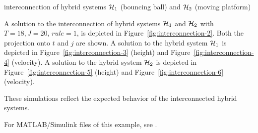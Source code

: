 \begin{example}{interconnection of hybrid systems $\mathcal{H}_1$ (bouncing ball) and $\mathcal{H}_2$ (moving platform)}
\begin{itemize}





\end{itemize}

A solution to the interconnection of hybrid systems $\mathcal{H}_1$ and
$\mathcal{H}_2$ with $T=18, J=20$, $rule =1$, is depicted in Figure~\ref{fig:interconnection-2}.
Both the projection onto $t$ and $j$ are shown. A solution to the hybrid system $\mathcal{H}_1$ is
depicted in Figure~\ref{fig:interconnection-3} (height) and Figure~\ref{fig:interconnection-4}
(velocity). A solution to the hybrid system $\mathcal{H}_2$ is depicted in
Figure~\ref{fig:interconnection-5} (height) and Figure~\ref{fig:interconnection-6} (velocity).

These simulations reflect the expected behavior of the interconnected hybrid systems. %

For MATLAB/Simulink files of this example, see .

\end{example}

